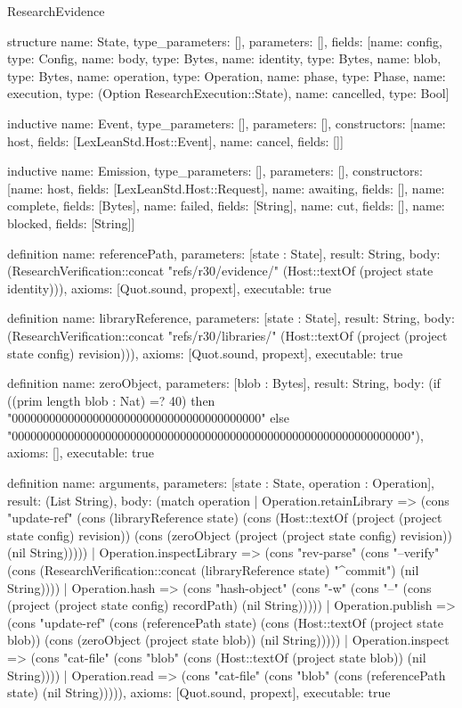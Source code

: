 \begin{lexlean}{ResearchEvidence}
\begin{semanticmodule}
structure{
 name: State,
 type_parameters: [],
 parameters: [],
 fields: [{name: config, type: Config}, {name: body, type: Bytes}, {name: identity, type: Bytes}, {name: blob, type: Bytes}, {name: operation, type: Operation}, {name: phase, type: Phase}, {name: execution, type: (Option ResearchExecution::State)}, {name: cancelled, type: Bool}]
}

inductive{
 name: Event,
 type_parameters: [],
 parameters: [],
 constructors: [{name: host, fields: [LexLeanStd.Host::Event]}, {name: cancel, fields: []}]
}

inductive{
 name: Emission,
 type_parameters: [],
 parameters: [],
 constructors: [{name: host, fields: [LexLeanStd.Host::Request]}, {name: awaiting, fields: []}, {name: complete, fields: [Bytes]}, {name: failed, fields: [String]}, {name: cut, fields: []}, {name: blocked, fields: [String]}]
}

definition{
 name: referencePath,
 parameters: [state : State],
 result: String,
 body: (ResearchVerification::concat "refs/r30/evidence/" (Host::textOf (project state identity))),
 axioms: [Quot.sound, propext],
 executable: true
}

definition{
 name: libraryReference,
 parameters: [state : State],
 result: String,
 body: (ResearchVerification::concat "refs/r30/libraries/" (Host::textOf (project (project state config) revision))),
 axioms: [Quot.sound, propext],
 executable: true
}

definition{
 name: zeroObject,
 parameters: [blob : Bytes],
 result: String,
 body: (if ((prim length blob : Nat) =? 40) then "0000000000000000000000000000000000000000" else "0000000000000000000000000000000000000000000000000000000000000000"),
 axioms: [],
 executable: true
}

definition{
 name: arguments,
 parameters: [state : State, operation : Operation],
 result: (List String),
 body: (match operation | Operation.retainLibrary => (cons "update-ref" (cons (libraryReference state) (cons (Host::textOf (project (project state config) revision)) (cons (zeroObject (project (project state config) revision)) (nil String))))) | Operation.inspectLibrary => (cons "rev-parse" (cons "--verify" (cons (ResearchVerification::concat (libraryReference state) "^{commit}") (nil String)))) | Operation.hash => (cons "hash-object" (cons "-w" (cons "--" (cons (project (project state config) recordPath) (nil String))))) | Operation.publish => (cons "update-ref" (cons (referencePath state) (cons (Host::textOf (project state blob)) (cons (zeroObject (project state blob)) (nil String))))) | Operation.inspect => (cons "cat-file" (cons "blob" (cons (Host::textOf (project state blob)) (nil String)))) | Operation.read => (cons "cat-file" (cons "blob" (cons (referencePath state) (nil String))))),
 axioms: [Quot.sound, propext],
 executable: true
}


\end{semanticmodule}
\end{lexlean}
